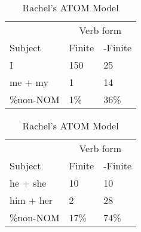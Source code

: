 \begin{table}[]
    \caption{Rachel's ATOM Model}
    \begin{minipage}{0.5\textwidth}
    \centering
    \begin{tabular}{@{}lll@{}}
        \toprule
         &\multicolumn{2}{c}{Verb form}\\
         \cline{2-3}
        Subject & Finite & -Finite \\
        \midrule
        I & 150 & 25 \\
        me + my & 1 & 14 \\
        \hline
        \%non-NOM & 1\% & 36\% \\
        \bottomrule
    \end{tabular}
\end{minipage}
\begin{minipage}{0.5\textwidth}
    \centering
    \begin{tabular}{@{}lll@{}}
        \toprule
         &\multicolumn{2}{c}{Verb form}\\
         \cline{2-3}
        Subject & Finite & -Finite \\
        \midrule
        he + she & 10 & 10 \\
        him + her & 2 & 28 \\
        \hline
        \%non-NOM & 17\% & 74\% \\
        \bottomrule
    \end{tabular}
    \end{minipage}
    \begin{minipage}{0.5\textwidth}
    

\end{minipage}
\end{table}
